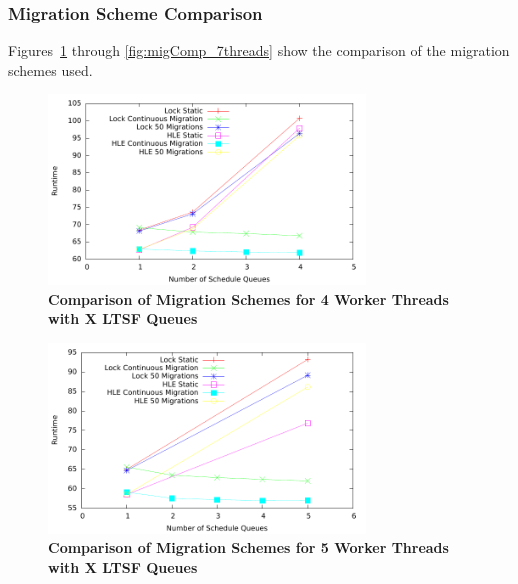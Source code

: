 \documentclass[11pt]{book}
\begin{document}
\subsubsection{Migration Scheme Comparison}

Figures~\ref{fig:migComp_4threads} through \ref{fig:migComp_7threads} show the comparison
of the migration schemes used.

\begin{figure}[H]
    \centering
    \graphicspath{ {./figures/} }
    \includegraphics[width=0.75\textwidth,keepaspectratio]{migComp_4threads}
    \caption{\textbf{Comparison of Migration Schemes for 4 Worker Threads with X LTSF
        Queues}}\label{fig:migComp_4threads}
\end{figure}

\begin{figure}[H]
    \centering
    \graphicspath{ {./figures/} }
    \includegraphics[width=0.75\textwidth,keepaspectratio]{migComp_5threads}
    \caption{\textbf{Comparison of Migration Schemes for 5 Worker Threads with X LTSF
        Queues}}\label{fig:migComp_5threads}
\end{figure}
\end{document}
